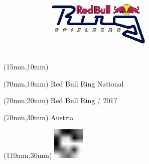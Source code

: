 \null\newpage
\begin{textblock*}{50mm}(15mm,10mm)%
\includegraphics[width=50mm]{LG/RED.png}
\end{textblock*}
\begin{textblock*}{130mm}(70mm,10mm)%
{\fontsize{20}{20}\selectfont Red Bull Ring National}\\
\end{textblock*}
\begin{textblock*}{120mm}(70mm,20mm)%
{\fontsize{16}{16}\selectfont Red Bull Ring / 2017}\\
\end{textblock*}
\begin{textblock*}{120mm}(70mm,30mm)%
{\fontsize{12}{12}\selectfont Austria}
\end{textblock*}
\begin{textblock*}{30mm}(110mm,30mm)%
\centering
\includegraphics[height=15mm]{icons/fa-rotate-right.pdf}
\end{textblock*}
